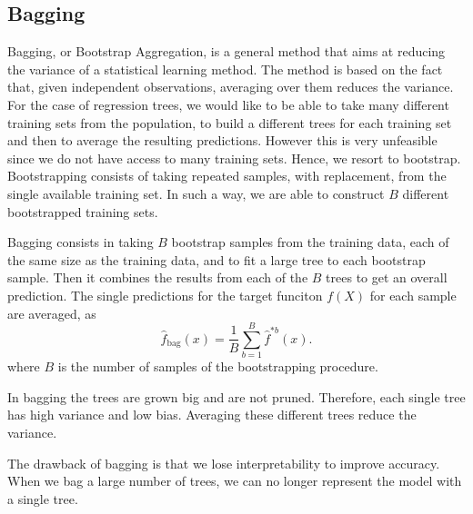 \documentclass[a4paper,11pt]{article}
\begin{document}
\subsection{Bagging}
Bagging, or Bootstrap Aggregation, is a general method that aims at reducing the variance of a statistical learning method. The method is based on the fact that, given independent observations, averaging over them reduces the variance.
For the case of regression trees, we would like to be able to take many different training sets from the population, to build a different trees for each training set and then to average the resulting predictions. However this is very unfeasible since we do not have access to many training sets. Hence, we resort to bootstrap. 
Bootstrapping consists of taking repeated samples, with replacement, from the single available training set. In such a way, we are able to construct $B$ different bootstrapped training sets.

Bagging consists in taking $B$ bootstrap samples from the training data, each of the same size as the training data, and to fit a large tree to each bootstrap sample. Then it combines the results from each of the $B$ trees to get an overall prediction.
The single predictions for the target funciton $f(X)$ for each sample are averaged, as
\begin{equation}
  \label{eq_bagging}
  \hat{f}_{\text{bag}}(x) = \frac{1}{B} \sum_{b=1}^{B} \hat{f}^{*b}(x).
\end{equation}
where $B$ is the number of samples of the bootstrapping procedure.

In bagging the trees are grown big and are not pruned. Therefore, each single tree has high variance and low bias. Averaging these different trees reduce the variance. 

The drawback of bagging is that we lose interpretability to improve accuracy. When we bag a large number of trees, we can no longer represent the model with a single tree.
\end{document}
